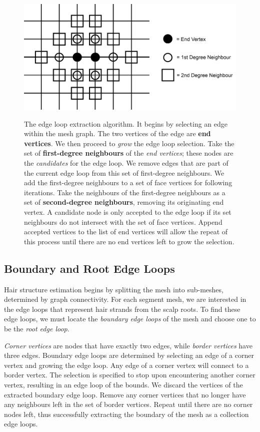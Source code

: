 \documentclass[ %
author={Dillon Keith Diep},
supervisor={Dr. Carl Henrik Ek},
degree={MEng},
title={ART-CG Hair:},
subtitle={Assisted Real-time Content Generation of Stylised Virtual Hair},
type={Research},
year={2017} ]{dissertation}
\begin{document}
\begin{figure}[!h]
	\centering
	\caption{The edge loop extraction algorithm. It begins by selecting an edge within the mesh graph. The two vertices of the edge are \textbf{end vertices}. We then proceed to \textit{grow} the edge loop selection. Take the set of \textbf{first-degree neighbours} of the \textit{end vertices}; these nodes are the \textit{candidates} for the edge loop. We remove edges that are part of the current edge loop from this set of first-degree neighbours. We add the first-degree neighbours to a set of face vertices for following iterations. Take the neighbours of the first-degree neighbours as a set of \textbf{second-degree neighbours}, removing its originating end vertex. A candidate node is only accepted to the edge loop if its set neighbours do not intersect with the set of face vertices. Append accepted vertices to the list of end vertices will allow the repeat of this process until there are no end vertices left to grow the selection.}
	\includegraphics[scale=0.35]{images/edgeLoopDiagram}\\
	\label{edgeLoopFig}
\end{figure}

\subsection{Boundary and Root Edge Loops}
Hair structure estimation begins by splitting the mesh into sub-meshes, determined by graph connectivity. For each segment mesh, we are interested in the edge loops that represent hair strands from the scalp roots. To find these edge loops, we must locate the \textit{boundary edge loops} of the mesh and choose one to be the \textit{root edge loop}.

\textit{Corner vertices} are nodes that have exactly two edges, while \textit{border vertices} have three edges. Boundary edge loops are determined by selecting an edge of a corner vertex and growing the edge loop. Any edge of a corner vertex will connect to a border vertex. The selection is specified to stop upon encountering another corner vertex, resulting in an edge loop of the bounds. We discard the vertices of the extracted boundary edge loop. Remove any corner vertices that no longer have any neighbours left in the set of border vertices. Repeat until there are no corner nodes left, thus successfully extracting the boundary of the mesh as a collection edge loops.
\end{document}
